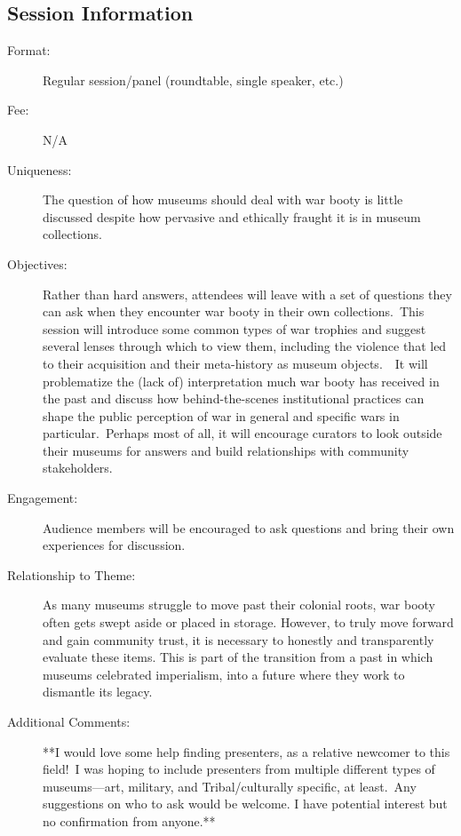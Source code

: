 \documentclass{report}
\begin{document}
              \subsection*{Session Information}
                \begin{description}
                  \item [Format:] Regular session/panel (roundtable, single speaker, etc.)
							    
								  \item [Fee:]N/A
							     
							    \item [Uniqueness:]The question of how museums should deal with war booty is little discussed despite how pervasive and ethically fraught it is in museum collections.
							    \item [Objectives:]Rather than hard answers, attendees will leave with a set of questions they can ask when they encounter war booty in their own collections. This session will introduce some common types of war trophies and suggest several lenses through which to view them, including the violence that led to their acquisition and their meta-history as museum objects.  It will problematize the (lack of) interpretation much war booty has received in the past and discuss how behind-the-scenes institutional practices can shape the public perception of war in general and specific wars in particular. Perhaps most of all, it will encourage curators to look outside their museums for answers and build relationships with community stakeholders.
							    \item [Engagement:]Audience members will be encouraged to ask questions and bring their own experiences for discussion.
							    \item [Relationship to Theme:]As many museums struggle to move past their colonial roots, war booty often gets swept aside or placed in storage.  However, to truly move forward and gain community trust, it is necessary to honestly and transparently evaluate these items. This is part of the transition from a past in which museums celebrated imperialism, into a future where they work to dismantle its legacy.
							    
                    \item [Additional Comments: ]**I would love some help finding presenters, as a relative newcomer to this field! I was hoping to include presenters from multiple different types of museums—art, military, and Tribal/culturally specific, at least. Any suggestions on who to ask would be welcome. I have potential interest but no confirmation from anyone.**

                \end{description}
\end{document}
